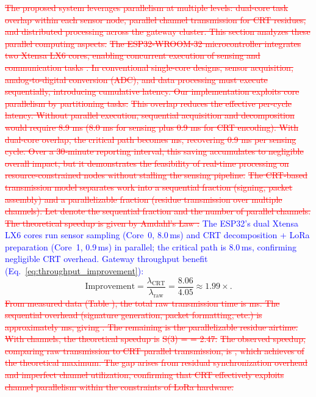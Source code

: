 \documentclass[pdflatex,sn-mathphys-num]{sn-jnl}
\theoremstyle{thmstyleone}
\theoremstyle{thmstyletwo}
\theoremstyle{thmstylethree}
\begin{document}
{\textcolor{red}{\sout{The proposed system leverages parallelism at multiple levels: dual-core task overlap within each sensor node, parallel channel transmission for CRT residues, and distributed processing across the gateway cluster. This section analyzes these parallel computing aspects.}}
\textcolor{red}{\sout{The ESP32-WROOM-32 microcontroller integrates two Xtensa LX6 cores, enabling concurrent execution of sensing and communication tasks . In conventional single-core designs, sensor acquisition, analog-to-digital conversion (ADC), and data processing must execute sequentially, introducing cumulative latency. Our implementation exploits core parallelism by partitioning tasks:}}
\textcolor{red}{\sout{This overlap reduces the effective per-cycle latency. Without parallel execution, sequential acquisition and decomposition would require 8.9 ms (8.0 ms for sensing plus 0.9 ms for CRT encoding). With dual-core overlap, the critical path becomes ms, recovering 0.9 ms per sensing cycle. Over a 30‑minute reporting interval, this saving accumulates to negligible overall impact, but it demonstrates the feasibility of real-time processing on resource-constrained nodes without stalling the sensing pipeline.}}
\textcolor{red}{\sout{The CRT-based transmission model separates work into a sequential fraction (signing, packet assembly) and a parallelizable fraction (residue transmission over multiple channels). Let denote the sequential fraction and the number of parallel channels. The theoretical speedup is given by Amdahl’s Law :}}
\textcolor{blue}{The ESP32’s dual Xtensa LX6 cores \cite{espressif2020esp32} run sensor sampling (Core~0, 8.0\,ms) and CRT decomposition + LoRa preparation (Core~1, 0.9\,ms) in parallel; the critical path is 8.0\,ms, confirming negligible CRT overhead. Gateway throughput benefit (Eq.~\ref{eq:throughput_improvement}):}
\begin{equation}
\text{Improvement} = \frac{\lambda_{\text{CRT}}}{\lambda_{\text{raw}}} = \frac{8.06}{4.05} \approx 1.99\times.
\label{eq:throughput_improvement}
\end{equation}
\textcolor{red}{\sout{From measured data (Table ), the total raw transmission time is ms. The sequential overhead (signature generation, packet formatting, etc.) is approximately ms, giving . The remaining is the parallelizable residue airtime. With channels, the theoretical speedup is}}
\textcolor{red}{\sout{S(3) = = 2.47.}}
\textcolor{red}{\sout{The observed speedup, comparing raw transmission to CRT parallel transmission, is , which achieves of the theoretical maximum. The gap arises from residual synchronization overhead and imperfect channel utilization, confirming that CRT effectively exploits channel parallelism within the constraints of LoRa hardware.}}
}
\end{document}
